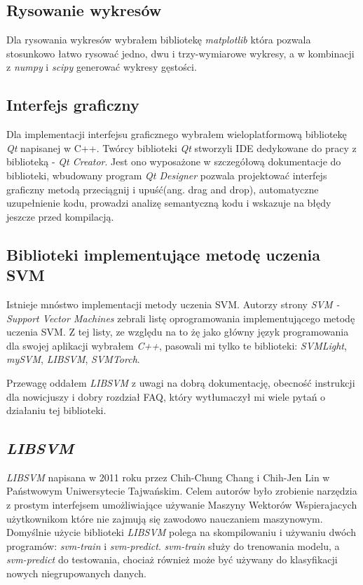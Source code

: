 \documentclass[paper=a4, fontsize=11pt]{scrartcl} %
\numberwithin{equation}{section} %
\numberwithin{figure}{section} %
\begin{document}
\subsection{Rysowanie wykresów}
    \par Dla rysowania wykresów wybrałem bibliotekę \textit{matplotlib} \cite{matplotlib} która
    pozwala stosunkowo łatwo rysować jedno, dwu i trzy-wymiarowe wykresy, a w kombinacji z
    \textit{numpy} i \textit{scipy} generować wykresy gęstości.  

\subsection{Interfejs graficzny}
    \par Dla implementacji interfejsu graficznego wybrałem wieloplatformową bibliotekę
    \textit{Qt} \cite{qtlibrary} napisanej w C++.  Twórcy biblioteki \textit{Qt} stworzyli IDE
    dedykowane do pracy z biblioteką - \textit{Qt Creator}. Jest ono wyposażone w szczegółową
    dokumentacje do biblioteki, wbudowany program \textit{Qt Designer} pozwala projektować
    interfejs graficzny metodą przeciągnij i upuść(ang. drag and drop), automatyczne
    uzupełnienie kodu, prowadzi analizę semantyczną kodu i wskazuje na błędy jeszcze przed
    kompilacją.

\subsection{Biblioteki implementujące metodę uczenia SVM}
    \par Istnieje mnóstwo implementacji metody uczenia SVM. Autorzy strony \textit{SVM -
    Support Vector Machines}\cite{svm_soft} zebrali listę oprogramowania implementującego
    metodę uczenia SVM. Z tej listy, ze względu na to żę jako główny język programowania dla
    swojej aplikacji wybrałem \textit{C++}, pasowali mi tylko te biblioteki: \textit{SVMLight},
    \textit{mySVM}, \textit{LIBSVM}, \textit{SVMTorch}. 

    \par Przewagę oddałem \textit{LIBSVM} z uwagi na dobrą dokumentację, obecność instrukcji
    dla nowicjuszy i dobry rozdział FAQ, który wytłumaczył mi wiele pytań o działaniu tej
    biblioteki.

\subsection{\textit{LIBSVM}} 
    \par \textit{LIBSVM} napisana w 2011 roku przez Chih-Chung Chang i Chih-Jen Lin w
    Państwowym Uniwersytecie Tajwańskim. Celem autorów było zrobienie narzędzia z prostym
    interfejsem umożliwiające używanie Maszyny Wektorów Wspierajacych użytkownikom które nie
    zajmują się zawodowo nauczaniem maszynowym. Domyślnie użycie biblioteki \textit{LIBSVM}
    polega na skompilowaniu i używaniu dwóch programów: \textit{svm-train} i
    \textit{svm-predict}. \textit{svm-train} służy do trenowania modelu, a \textit{svm-predict}
    do testowania, chociaż również może być używany do klasyfikacji nowych niegrupowanych
    danych. 
\end{document}
